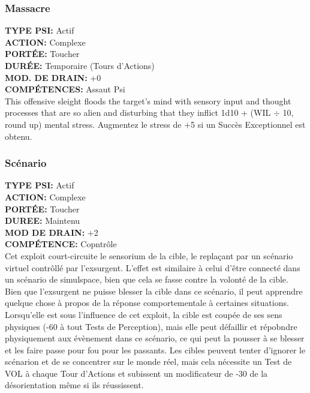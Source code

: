 \subsubsection{Massacre} \textbf{TYPE PSI:} Actif \\ \textbf{ACTION:} Complexe \\ \textbf{PORTÉE:} Toucher \\ \textbf{DURÉE:} Temporaire (Tours d'Actions) \\ \textbf{MOD. DE DRAIN:} +0 \\ \textbf{COMPÉTENCES:} Assaut Psi \\ This offensive sleight floods the target's mind with sensory input and thought processes that are so alien and disturbing that they inflict 1d10 + (WIL $\div$ 10, round up) mental stress. Augmentez le stress de +5 si un Succès Exceptionnel est obtenu. 

\subsubsection{Scénario } \textbf{TYPE PSI:} Actif \\ \textbf{ACTION:} Complexe \\ \textbf{PORTÉE:} Toucher \\ \textbf{DUREE:} Maintenu \\ \textbf{MOD DE DRAIN:} +2 \\ \textbf{COMPÉTENCE:} Copntrôle \\ Cet exploit court-circuite le sensorium de la cible, le replaçant par un scénario virtuel contrôllé par l'exsurgent. L'effet est similaire à celui d'être connecté dans un scénario de simulspace, bien que cela se fasse contre la volonté de la cible. Bien que l'exsurgent ne puisse blesser la cible dans ce scénario, il peut apprendre quelque chose à propos de la réponse comportementale à certaines situations. Lorsqu'elle est sous l'influence de cet exploit, la cible est coupée de ses sens physiques (-60 à tout Tests de Perception), mais elle peut défaillir et répobndre physiquement aux évènement dans ce scénario, ce qui peut la pousser à se blesser et les faire passe pour fou pour les passants. Les cibles peuvent tenter d'ignorer le scénarion et de se concentrer sur le monde réel, mais cela nécessite un Test de VOL à chaque Tour d'Actions et subissent un modificateur de -30 de la désorientation même si ils réussissent. 

